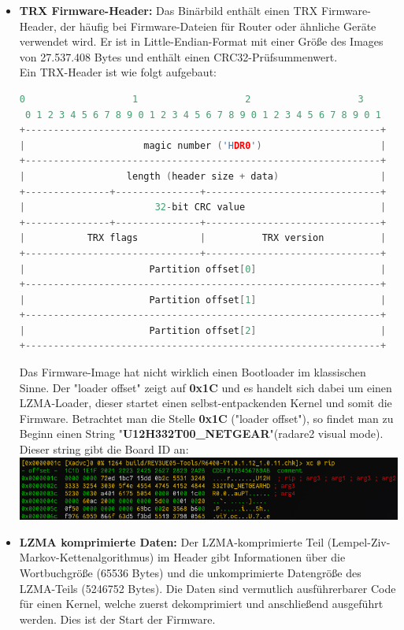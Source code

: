 \documentclass{article}
\begin{document}
	\begin{itemize}
		\item \textbf{TRX Firmware-Header:} Das Binärbild enthält einen TRX Firmware-Header, der häufig bei Firmware-Dateien für Router oder ähnliche Geräte verwendet wird. Er ist in Little-Endian-Format mit einer Größe des Images von 27.537.408 Bytes und enthält einen CRC32-Prüfsummenwert.\\
		Ein TRX-Header ist wie folgt aufgebaut:\\
		\begin{lstlisting}[language=c]
  0                   1                   2                   3   
 0 1 2 3 4 5 6 7 8 9 0 1 2 3 4 5 6 7 8 9 0 1 2 3 4 5 6 7 8 9 0 1 
+---------------------------------------------------------------+
|                     magic number ('HDR0')                     |
+---------------------------------------------------------------+
|                  length (header size + data)                  |
+---------------+---------------+-------------------------------+
|                       32-bit CRC value                        |
+---------------+---------------+-------------------------------+
|           TRX flags           |          TRX version          |
+-------------------------------+-------------------------------+
|                      Partition offset[0]                      |
+---------------------------------------------------------------+
|                      Partition offset[1]                      |
+---------------------------------------------------------------+
|                      Partition offset[2]                      |
+---------------------------------------------------------------+\end{lstlisting}
		Das Firmware-Image hat nicht wirklich einen Bootloader im klassischen Sinne. Der "loader offset" zeigt auf \textbf{0x1C} und es handelt sich dabei um einen LZMA-Loader, dieser startet einen selbst-entpackenden Kernel und somit die Firmware.
		Betrachtet man die Stelle \textbf{0x1C} ("loader offset"), so findet man zu Beginn einen String "\textbf{U12H332T00\_NETGEAR}"(radare2 visual mode). Dieser string gibt die Board ID an:\\
		\includegraphics[width=0.7\linewidth]{"pictures/1.2.1 bootloader"}
		
		\item \textbf{LZMA komprimierte Daten:} Der LZMA-komprimierte Teil (Lempel-Ziv-Markov-Kettenalgorithmus) im Header gibt Informationen über die Wortbuchgröße (65536 Bytes) und die unkomprimierte Datengröße des LZMA-Teils (5246752 Bytes). Die Daten sind vermutlich ausführerbarer Code für einen Kernel, welche zuerst dekomprimiert und anschließend ausgeführt werden. Dies ist der Start der Firmware.
		

\end{itemize}
\end{document}
